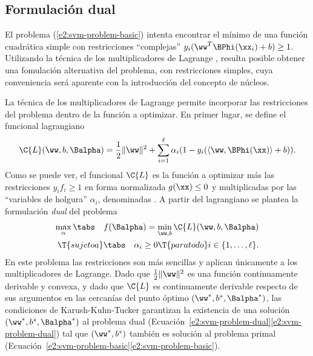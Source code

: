 %
%
\subsection{Formulación dual}
%
El problema (\ref{e2:svm-problem-basic}) intenta encontrar el mínimo
de una función cuadrática simple con restricciones ``complejas''
${y}_i(\ww^T\BPhi(\xx_i)+b)\geq{}1$.  Utilizando la técnica de los
multiplicadores de Lagrange \cite{bottou,kkt}, resulta posible obtener
una fomulación alternativa del problema, con restricciones simples,
cuya conveniencia será aparente con la introducción del concepto de
núcleos.

La técnica de los multiplicadores de Lagrange permite incorporar las
restricciones del problema dentro de la función a optimizar.  En
primer lugar, se define el funcional lagrangiano
%
\begin{align}\label{e2:lagrangian}
  \C{L}(\ww,b,\Balpha) = \frac{1}{2} \|\ww\|^2 + \sum_{i=1}^{\ell}
  \alpha_i (1-y_i(\langle\ww,\BPhi(\xx)\rangle+b)).
\end{align}
%
Como se puede ver, el funcional $\C{L}$ es la función a optimizar más
las restricciones ${y}_if_i\geq{}1$ en forma normalizada $g(\xx)\leq0$
y multiplicadas por las ``variables de holgura'' $\alpha_i$,
denominadas . A partir del lagrangiano
se plantea la formulación \emph{dual} del problema
%
\begin{align}\label{e2:svm-problem-dual}
  \begin{split}
    \max_\alpha \tabs\quad f(\Balpha) = \min_{\ww,b} \C{L}(\ww,b,\Balpha)\\
    \T{sujeto a} \tabs\quad \alpha_i \geq 0\T{ para todo } i\in\{1,\ldots,\ell\}.
  \end{split}
\end{align}
%
En este problema las restricciones son más sencillas y
aplican únicamente a los multiplicadores de Lagrange. 
Dado que $\frac{1}{2}\|\ww\|^2$ es una función continuamente derivable
y convexa, y dado que $\C{L}$ es continuamente derivable respecto de
sus argumentos en las cercanías del punto óptimo
$(\ww^*,b^*,\Balpha^*)$, las condiciones de Karush-Kuhn-Tucker
\cite{kkt} garantizan la existencia de una solución
$(\ww^*,b^*,\Balpha^*)$ al problema dual
(\iflatexml{}Ecuación~\ref{e2:svm-problem-dual}\else\autoref{e2:svm-problem-dual}\fi)
tal que $(\ww^*,b^*)$ también es solución al problema primal
(\iflatexml{}Ecuación~\ref{e2:svm-problem-basic}\else\autoref{e2:svm-problem-basic}\fi).

